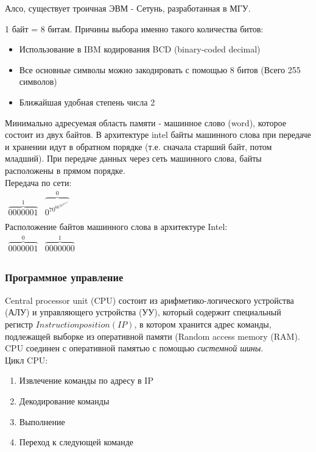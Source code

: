 \documentclass[]{article}
\begin{document}
			Алсо, существует троичная ЭВМ - Сетунь, разработанная в МГУ.
			
			1 байт = 8 битам. Причины выбора именно такого количества битов:
			\begin{itemize}
				\item Использование в IBM кодирования BCD (binary-coded decimal)
				\item Все основные символы можно закодировать с помощью 8 битов (Всего 255 символов)
				\item Ближайшая удобная степень числа 2
			\end{itemize}
			Минимально адресуемая область памяти - машинное слово (word), которое состоит из двух байтов. В архитектуре intel байты машинного слова при передаче и хранении идут в обратном порядке (т.е. сначала старший байт, потом младший). При передаче данных через сеть машинного слова, байты расположены в прямом порядке.\\
			Передача по сети:\\
			$\begin{array}{|c|c|}
				\overbrace{0000001}^1 & \overbrace{0^70^60^50^40^30^20^10^0}^0\\
			\end{array}$\\
			Расположение байтов машинного слова в архитектуре Intel:\\
			$\begin{array}{|c|c|}
				\overbrace{0000001}^0 & \overbrace{0000000}^1\\
			\end{array}$
		
		\subsubsection{Программное управление}
			Central processor unit (CPU) состоит из арифметико-логического устройства (АЛУ) и управляющего устройства (УУ), который содержит специальный регистр $Instruction position (IP)$, в котором хранится адрес команды, подлежащей выборке из оперативной памяти (Random access memory (RAM). CPU соединен с оперативной памятью с помощью \textit{системной шины}.\\
			Цикл CPU:\\
			\begin{enumerate}
				\item Извлечение команды по адресу в IP
				\item Декодирование команды
				\item Выполнение
				\item Переход к следующей команде
			\end{enumerate}
			
\end{document}
